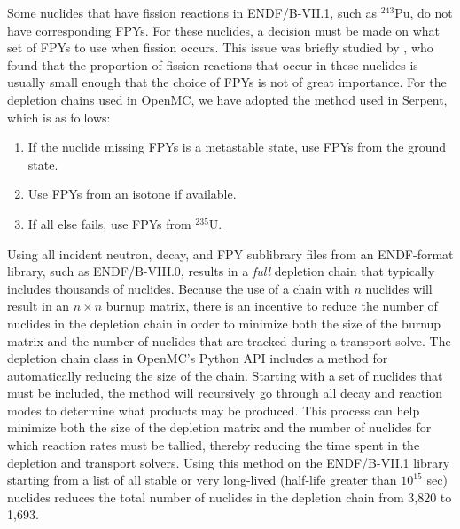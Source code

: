 \documentclass[3p,authoryear]{elsarticle}
\begin{document}
Some nuclides that have fission reactions in ENDF/B-VII.1, such as $^{243}$Pu,
do not have corresponding FPYs. For these nuclides, a decision must be made on
what set of FPYs to use when fission occurs. This issue was briefly studied by
\citet{fensin2015pne}, who found that the proportion of fission reactions that
occur in these nuclides is usually small enough that the choice of FPYs is not
of great importance. For the depletion chains used in OpenMC, we have adopted
the method used in Serpent, which is as follows:
\begin{enumerate}
  \item If the nuclide missing FPYs is a metastable state, use FPYs from the
  ground state.
  \item Use FPYs from an isotone if available.
  \item If all else fails, use FPYs from $^{235}$U.
\end{enumerate}

Using all incident neutron, decay, and FPY sublibrary files from an ENDF-format
library, such as ENDF/B-VIII.0, results in a \emph{full} depletion chain that
typically includes thousands of nuclides. Because the use of a chain with $n$
nuclides will result in an $n\times n$ burnup matrix, there is an incentive to
reduce the number of nuclides in the depletion chain in order to minimize both
the size of the burnup matrix and the number of nuclides that are tracked during
a transport solve. The depletion chain class in OpenMC's Python API includes a
method for automatically reducing the size of the chain. Starting with a set of
nuclides that must be included, the method will recursively go through all decay
and reaction modes to determine what products may be produced. This process can
help minimize both the size of the depletion matrix and the number of nuclides
for which reaction rates must be tallied, thereby reducing the time spent in the
depletion and transport solvers. Using this method on the ENDF/B-VII.1 library
starting from a list of all stable or very long-lived (half-life greater than
$10^{15}$ sec) nuclides reduces the total number of nuclides in the depletion
chain from 3,820 to 1,693.
\end{document}
